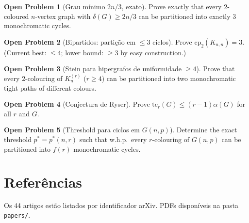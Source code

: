 \documentclass[12pt,a4paper,twoside,openright]{book}
\theoremstyle{definition}
\newtheorem{problem}{Open Problem}[chapter]
\begin{document}
\begin{problem}[Grau mínimo $2n/3$, exato]
Prove exactly that every $2$-coloured $n$-vertex graph with $\delta(G) \geq 2n/3$ can be partitioned
into exactly $3$ monochromatic cycles.
\end{problem}

\begin{problem}[Bipartidos: partição em $\leq 3$ ciclos]
Prove $\mathrm{cp}_2(K_{n,n}) = 3$.
(Current best: $\leq 4$; lower bound: $\geq 3$ by easy construction.)
\end{problem}

\begin{problem}[Stein para hipergrafos de uniformidade $\geq 4$]
Prove that every $2$-colouring of $K_n^{(r)}$ ($r \geq 4$) can be partitioned into two monochromatic
tight paths of different colours.
\end{problem}

\begin{problem}[Conjectura de Ryser]
Prove $\mathrm{tc}_r(G) \leq (r-1)\alpha(G)$ for all $r$ and $G$.
\end{problem}

\begin{problem}[Threshold para ciclos em $G(n,p)$]
Determine the exact threshold $p^* = p^*(n,r)$ such that w.h.p.\ every $r$-colouring of $G(n,p)$
can be partitioned into $f(r)$ monochromatic cycles.
\end{problem}

\chapter*{Referências}

\noindent Os 44 artigos estão listados por identificador arXiv. PDFs disponíveis na pasta \texttt{papers/}.
\end{document}
